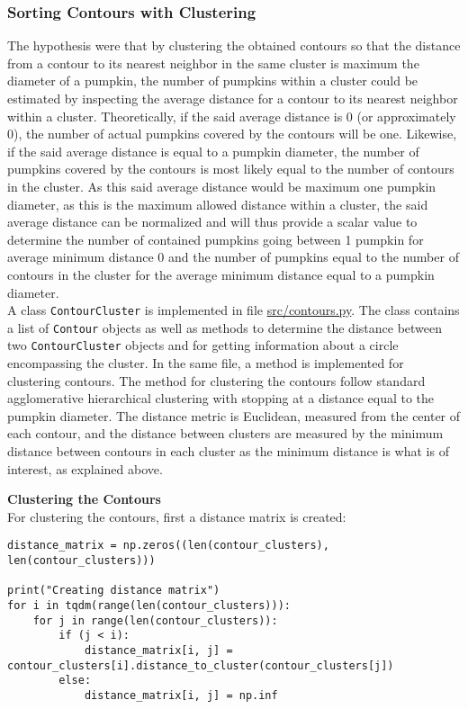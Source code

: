 \documentclass[../Head/Main.tex]{subfiles}
\begin{document}
\subsubsection{Sorting Contours with Clustering}
The hypothesis were that by clustering the obtained contours so that the distance from a contour to its nearest neighbor in the same cluster is maximum the diameter of a pumpkin, the number of pumpkins within a cluster could be estimated by inspecting the average distance for a contour to its nearest neighbor within a cluster. Theoretically, if the said average distance is 0 (or approximately 0), the number of actual pumpkins covered by the contours will be one. Likewise, if the said average distance is equal to a pumpkin diameter, the number of pumpkins covered by the contours is most likely equal to the number of contours in the cluster. As this said average distance would be maximum one pumpkin diameter, as this is the maximum allowed distance within a cluster, the said average distance can be normalized and will thus provide a scalar value to determine the number of contained pumpkins going between 1 pumpkin for average minimum distance 0 and the number of pumpkins equal to the number of contours in the cluster for the average minimum distance equal to a pumpkin diameter.\\
A class \verb+ContourCluster+ is implemented in file \url{src/contours.py}. The class contains a list of \verb+Contour+ objects as well as methods to determine the distance between two \verb+ContourCluster+ objects and for getting information about a circle encompassing the cluster. In the same file, a method is implemented for clustering contours. The method for clustering the contours follow standard agglomerative hierarchical clustering with stopping at a distance equal to the pumpkin diameter. The distance metric is Euclidean, measured from the center of each contour, and the distance between clusters are measured by the minimum distance between contours in each cluster as the minimum distance is what is of interest, as explained above.\par
\textbf{Clustering the Contours}\\
For clustering the contours, first a distance matrix is created:
\begin{verbatim}
distance_matrix = np.zeros((len(contour_clusters), len(contour_clusters)))

print("Creating distance matrix")
for i in tqdm(range(len(contour_clusters))):
    for j in range(len(contour_clusters)):
        if (j < i):
            distance_matrix[i, j] = contour_clusters[i].distance_to_cluster(contour_clusters[j])
        else:
            distance_matrix[i, j] = np.inf
\end{verbatim}
\end{document}
